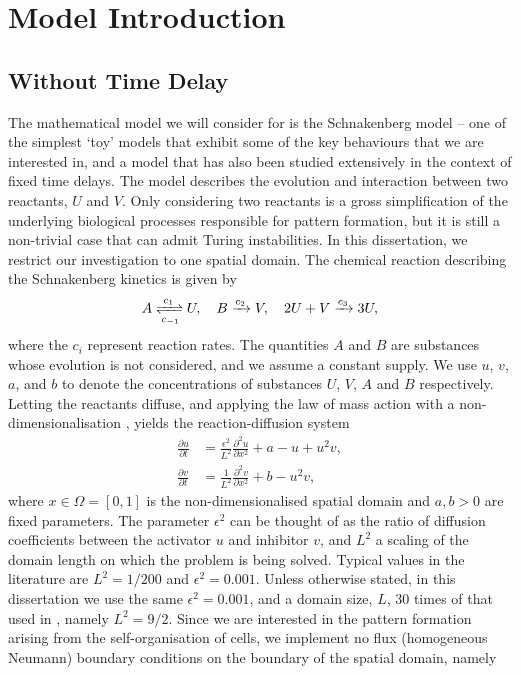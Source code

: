 \section{Model Introduction}
\subsection{Without Time Delay}
The mathematical model we will consider for  is the Schnakenberg model \cite{schnakenberg} -- one of the simplest `toy' models that exhibit some of the key behaviours that we are interested in, and a model that has also been studied extensively in the context of fixed time delays. The model describes the evolution and interaction between two reactants, $U$ and $V$. Only considering two reactants is a gross simplification of the underlying biological processes responsible for pattern formation, but it is still a non-trivial case that can admit Turing instabilities. In this dissertation, we restrict our investigation to one spatial domain. The chemical reaction describing the Schnakenberg kinetics \cite{baker} is given by
\begin{equation}\label{chem}
A\xrightleftharpoons[c_{-1}]{c_1} U,\quad B\xrightarrow{c_2} V,\quad 2U+V\xrightarrow{c_3} 3U,
\end{equation}
where the $c_i$ represent reaction rates. The quantities $A$ and $B$ are substances whose evolution is not considered, and we assume a constant supply. We use $u$, $v$, $a$, and $b$ to denote the concentrations of substances $U$, $V$, $A$ and $B$ respectively. Letting the reactants diffuse, and applying the law of mass action with a non-dimensionalisation \cite{murray}, yields the reaction-diffusion system
\begin{equation}\label{system}
    \begin{split}
    \frac{\partial u}{\partial t}&=\frac{\epsilon^2}{L^2}\frac{\partial^2 u}{\partial x^2}+a-u+u^2v,\\
    \frac{\partial v}{\partial t}&=\frac{1}{L^2}\frac{\partial^2 v}{\partial x^2}+b-u^2v,
    \end{split}
\end{equation}
where $x\in\Omega=[0,1]$ is the non-dimensionalised spatial domain and $a,b>0$ are fixed parameters. The parameter $\epsilon^2$ can be thought of as the ratio of diffusion coefficients between the activator $u$ and inhibitor $v$, and $L^2$ a scaling of the domain length on which the problem is being solved. Typical values in the literature \cite{gaffmonk} are $L^2=1/200$ and $\epsilon^2=0.001$. Unless otherwise stated, in this dissertation we use the same $\epsilon^2=0.001$, and a domain size, $L$, $30$ times of that used in \cite{gaffmonk}, namely $L^2=9/2$. Since we are interested in the pattern formation arising from the self-organisation of cells, we implement no flux (homogeneous Neumann) boundary conditions on the boundary of the spatial domain, namely
